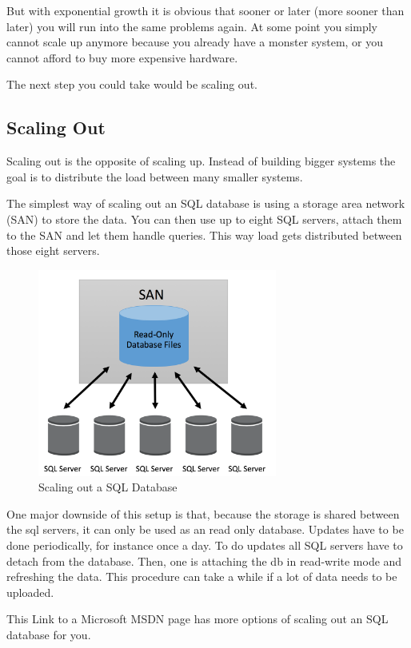 \documentclass[12pt, numbers=noenddot]{scrreprt} %
\begin{document}
But with exponential growth it is obvious that sooner or later (more sooner than later) you will run into the same problems again. At some point you simply cannot scale up anymore because you already have a monster system, or you cannot afford to buy more expensive hardware.

The next step you could take would be scaling out.

\subsection{Scaling Out}
Scaling out is the opposite of scaling up. Instead of building bigger systems the goal is to distribute the load between many smaller systems.

The simplest way of scaling out an SQL database is using a storage area network (SAN) to store the data. You can then use up to eight SQL servers, attach them to the SAN and let them handle queries. This way load gets distributed between those eight servers.

\begin{figure}[htbp]
  \centering
     \includegraphics[width=0.7\textwidth]{images/SQL-Scaling-Out}
  \caption{Scaling out a SQL Database}
  \label{fig:Bild1}
\end{figure}

One major downside of this setup is that, because the storage is shared between the sql servers, it can only be used as an read only database. Updates have to be done periodically, for instance once a day. To do updates all SQL servers have to detach from the database. Then, one is attaching the db in read-write mode and refreshing the data. This procedure can take a while if a lot of data needs to be uploaded.

This Link to a Microsoft MSDN page has more options of scaling out an SQL database for you.
\end{document}
